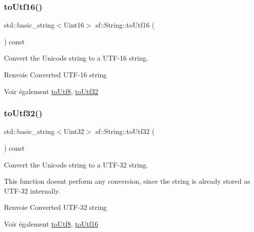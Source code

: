 \subsubsection{\texorpdfstring{to\+Utf16()}{toUtf16()}}
{\footnotesize\ttfamily std\+::basic\+\_\+string$<$Uint16$>$ sf\+::\+String\+::to\+Utf16 (\begin{DoxyParamCaption}{ }\end{DoxyParamCaption}) const}



Convert the Unicode string to a U\+T\+F-\/16 string. 

\begin{DoxyReturn}{Renvoie}
Converted U\+T\+F-\/16 string
\end{DoxyReturn}
\begin{DoxySeeAlso}{Voir également}
\hyperlink{classsf_1_1String_a9e12e9c568994e6df06962cf49180699}{to\+Utf8}, \hyperlink{classsf_1_1String_af1f2a3c069ce9e53fe901065cff41f68}{to\+Utf32} 
\end{DoxySeeAlso}
\mbox{\label{classsf_1_1String_af1f2a3c069ce9e53fe901065cff41f68}} 
\subsubsection{\texorpdfstring{to\+Utf32()}{toUtf32()}}
{\footnotesize\ttfamily std\+::basic\+\_\+string$<$Uint32$>$ sf\+::\+String\+::to\+Utf32 (\begin{DoxyParamCaption}{ }\end{DoxyParamCaption}) const}



Convert the Unicode string to a U\+T\+F-\/32 string. 

This function doesn\textquotesingle{}t perform any conversion, since the string is already stored as U\+T\+F-\/32 internally.

\begin{DoxyReturn}{Renvoie}
Converted U\+T\+F-\/32 string
\end{DoxyReturn}
\begin{DoxySeeAlso}{Voir également}
\hyperlink{classsf_1_1String_a9e12e9c568994e6df06962cf49180699}{to\+Utf8}, \hyperlink{classsf_1_1String_a476374646d92143c0efcae8ac1fbe4ce}{to\+Utf16} 
\end{DoxySeeAlso}
\mbox{\label{classsf_1_1String_a9e12e9c568994e6df06962cf49180699}} 
